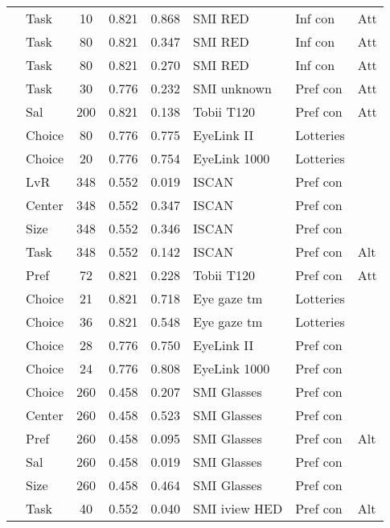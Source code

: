 \begin{longtable}{p{5cm}lccclll}
  \cite{bialkova2011} & Task & 10 & 0.821 & 0.868 & SMI RED & Inf con & Att \\ 
  \cite{bialkova2014a} & Task & 80 & 0.821 & 0.347 & SMI RED & Inf con & Att \\ 
  \cite{bialkova2014a} & Task & 80 & 0.821 & 0.270 & SMI RED & Inf con & Att \\ 
  \cite{bialkova2020} & Task & 30 & 0.776 & 0.232 & SMI unknown & Pref con & Att \\ 
  \cite{bogomolova2020} & Sal & 200 & 0.821 & 0.138 & Tobii T120 & Pref con & Att \\ 
  \cite{brandstatter2014} & Choice & 80 & 0.776 & 0.775 & EyeLink II & Lotteries &  \\ 
  \cite{cavanagh2014} & Choice & 20 & 0.776 & 0.754 & EyeLink 1000 & Lotteries &  \\ 
  \cite{chandon2009a} & LvR & 348 & 0.552 & 0.019 & ISCAN & Pref con &  \\ 
  \cite{chandon2009a} & Center & 348 & 0.552 & 0.347 & ISCAN & Pref con &  \\ 
  \cite{chandon2009a} & Size & 348 & 0.552 & 0.346 & ISCAN & Pref con &  \\ 
  \cite{chandon2009a} & Task & 348 & 0.552 & 0.142 & ISCAN & Pref con & Alt \\ 
  \cite{du2014} & Pref & 72 & 0.821 & 0.228 & Tobii T120 & Pref con & Att \\ 
  \cite{fiedler2012} & Choice & 21 & 0.821 & 0.718 & Eye gaze tm & Lotteries &  \\ 
  \cite{fiedler2012} & Choice & 36 & 0.821 & 0.548 & Eye gaze tm & Lotteries &  \\ 
  \cite{folke2016} & Choice & 28 & 0.776 & 0.750 & EyeLink II & Pref con &  \\ 
  \cite{folke2016} & Choice & 24 & 0.776 & 0.808 & EyeLink 1000 & Pref con &  \\ 
  \cite{gidloef2017a} & Choice & 260 & 0.458 & 0.207 & SMI Glasses & Pref con &  \\ 
  \cite{gidloef2017a} & Center & 260 & 0.458 & 0.523 & SMI Glasses & Pref con &  \\ 
  \cite{gidloef2017a} & Pref & 260 & 0.458 & 0.095 & SMI Glasses & Pref con & Alt \\ 
  \cite{gidloef2017a} & Sal & 260 & 0.458 & 0.019 & SMI Glasses & Pref con &  \\ 
  \cite{gidloef2017a} & Size & 260 & 0.458 & 0.464 & SMI Glasses & Pref con &  \\ 
  \cite{gidlof2013} & Task & 40 & 0.552 & 0.040 & SMI iview HED & Pref con & Alt \\ 

\end{longtable}

